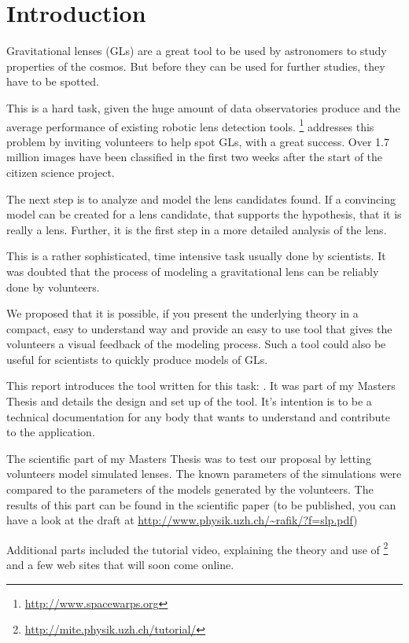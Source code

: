 \section{Introduction}

Gravitational lenses (GLs) are a great tool to be used by astronomers to study properties of the cosmos.
But before they can be used for further studies, they have to be spotted.

This is a hard task, given the huge amount of data observatories produce and the average performance of existing robotic lens detection tools.
\sw\footnote{\protect\url{http://www.spacewarps.org}} addresses this problem by inviting volunteers to help spot GLs, with a great success.
Over 1.7 million images have been classified in the first two weeks after the start of the citizen science project.

The next step is to analyze and model the lens candidates found.
If a convincing model can be created for a lens candidate, that supports the hypothesis, that it is really a lens. Further, it is the first step in a more detailed analysis of the lens.

This is a rather sophisticated, time intensive task usually done by scientists.
It was doubted that the process of  modeling a gravitational lens can be reliably done by volunteers.

We proposed that it is possible, if you present the underlying theory in a compact, easy to understand way and provide an easy to use tool that gives the volunteers a visual feedback of the modeling process.
Such a tool could also be useful for scientists to quickly produce models of GLs.

This report introduces the tool written for this task: \spl. It was part of my Masters Thesis and details the design and set up of the tool. It's intention is to be a technical documentation for any body that wants to understand and contribute to the application.

The scientific part of my Masters Thesis was to test our proposal by letting volunteers model simulated lenses. The known parameters of the simulations were compared to the parameters of the models generated by the volunteers. The results of this part can be found in the scientific paper (to be published, you can have a look at the draft at \url{http://www.physik.uzh.ch/~rafik/?f=slp.pdf})

Additional parts included the tutorial video, explaining the theory and use of \spl\footnote{\protect\url{http://mite.physik.uzh.ch/tutorial/}} and a few web sites that will soon come online.


